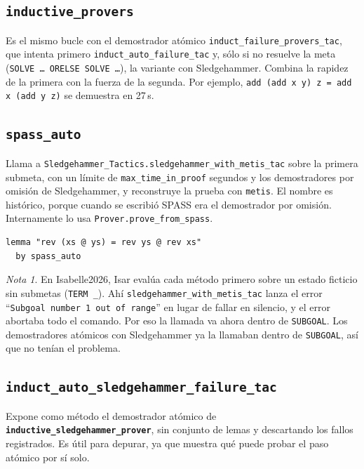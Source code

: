 \documentclass[11pt,a4paper]{article}
\newcommand{\isa}[1]{\texttt{#1}}
\newcommand{\cmd}[1]{\textbf{\texttt{#1}}}
\theoremstyle{definition}
\theoremstyle{remark}
\newtheorem*{nota}{Nota}
\begin{document}
\subsection{\texttt{inductive\_provers}}

Es el mismo bucle con el demostrador atómico \isa{induct\_failure\_provers\_tac},
que intenta primero \isa{induct\_auto\_failure\_tac} y, sólo si no resuelve la meta
(\isa{SOLVE \ldots\ ORELSE SOLVE \ldots}), la variante con Sledgehammer. Combina la
rapidez de la primera con la fuerza de la segunda. Por ejemplo,
\isa{add (add x y) z = add x (add y z)} se demuestra en 27\,s.

\subsection{\texttt{spass\_auto}}

Llama a \isa{Sledgehammer\_Tactics.sledgehammer\_with\_metis\_tac} sobre la primera
submeta, con un límite de \isa{max\_time\_in\_proof} segundos y los demostradores
por omisión de Sledgehammer, y reconstruye la prueba con \isa{metis}. El nombre es
histórico, porque cuando se escribió SPASS era el demostrador por omisión. Internamente
lo usa \isa{Prover.prove\_from\_spass}.
\begin{lstlisting}
lemma "rev (xs @ ys) = rev ys @ rev xs"
  by spass_auto
\end{lstlisting}

\begin{nota}
En Isabelle2026, Isar evalúa cada método primero sobre un estado ficticio sin
submetas (\isa{TERM \_}). Ahí \isa{sledgehammer\_with\_metis\_tac} lanza el error
``\isa{Subgoal number 1 out of range}'' en lugar de fallar en silencio, y el error
abortaba todo el comando. Por eso la llamada va ahora dentro de \isa{SUBGOAL}. Los
demostradores atómicos con Sledgehammer ya la llamaban dentro de \isa{SUBGOAL}, así
que no tenían el problema.
\end{nota}

\subsection{\texttt{induct\_auto\_sledgehammer\_failure\_tac}}

Expone como método el demostrador atómico de
\cmd{inductive\_sledgehammer\_prover}, sin conjunto de lemas y descartando los
fallos registrados. Es útil para depurar, ya que muestra qué puede probar el paso
atómico por sí solo.
\end{document}
